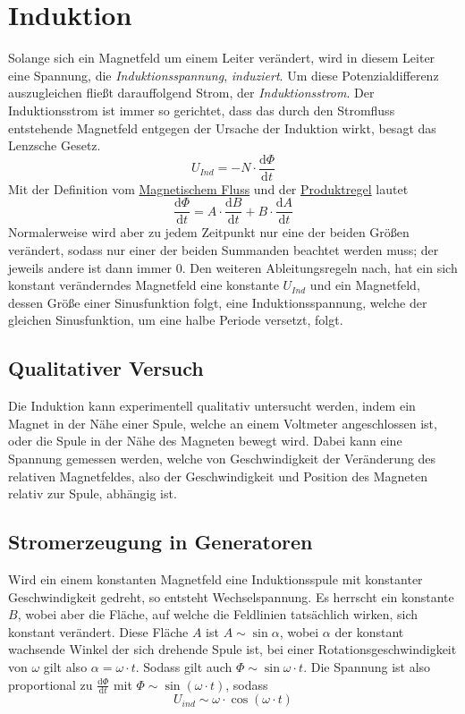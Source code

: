 \documentclass{article}
\begin{document}
 
\newcommand{\derive}[2]{\frac{\mathrm{d}#1}{\mathrm{d}#2}} 
 
\section{Induktion}  
Solange sich ein Magnetfeld um einem Leiter verändert, wird in diesem Leiter eine Spannung, die \emph{Induktionsspannung}, \emph{induziert}. \newline
Um diese Potenzialdifferenz auszugleichen fließt darauffolgend Strom, der \emph{Induktionsstrom}. Der Induktionsstrom ist immer so gerichtet, dass das  durch den Stromfluss entstehende Magnetfeld entgegen der Ursache der Induktion wirkt, besagt das Lenzsche Gesetz. 
\[
 U_{Ind} = -N \cdot \derive{\Phi}{t}
\] 
Mit der Definition vom \hyperref[Magnetischer Fluss]{Magnetischem Fluss} und der \hyperref[Ableitungsregeln]{Produktregel} lautet
\[
 \derive{\Phi}{t} = A \cdot \derive{B}{t} + B \cdot \derive{A}{t} 
\] 
Normalerweise wird aber zu jedem Zeitpunkt nur eine der beiden Größen verändert, sodass nur einer der beiden Summanden beachtet werden muss; der jeweils andere ist dann immer $0$.
Den weiteren Ableitungsregeln nach, hat ein sich konstant veränderndes Magnetfeld eine konstante $U_{Ind}$ und ein Magnetfeld, dessen Größe einer Sinusfunktion folgt, eine Induktionsspannung, welche der gleichen Sinusfunktion, um eine halbe Periode versetzt, folgt. 
 
\subsection{Qualitativer Versuch}
Die Induktion kann experimentell qualitativ untersucht werden, indem ein Magnet in der Nähe einer Spule, welche an einem Voltmeter angeschlossen ist, oder die Spule in der Nähe des Magneten bewegt wird. Dabei kann eine Spannung gemessen werden, welche von Geschwindigkeit der Veränderung des relativen Magnetfeldes, also der Geschwindigkeit und Position des Magneten relativ zur Spule, abhängig ist.
 
\subsection{Stromerzeugung in Generatoren}
Wird ein einem konstanten Magnetfeld eine Induktionsspule mit konstanter Geschwindigkeit gedreht, so entsteht Wechselspannung. Es herrscht ein konstante $B$, wobei aber die Fläche, auf welche die Feldlinien tatsächlich wirken, sich konstant verändert. Diese Fläche $A$ ist $A \sim \sin{\alpha}$, wobei $\alpha$ der konstant wachsende Winkel der sich drehende Spule ist, bei einer Rotationsgeschwindigkeit von $\omega$ gilt also $\alpha = \omega \cdot t$. Sodass gilt auch $\Phi \sim \sin{\omega \cdot t}$. Die Spannung ist also proportional zu $\displaystyle \derive{\Phi}{t}$ mit $\Phi \sim \sin{(\omega \cdot t)}$, sodass
\[
 U_{ind} \sim \omega \cdot \cos{(\omega \cdot t)}
\] 
 
\end{document}
